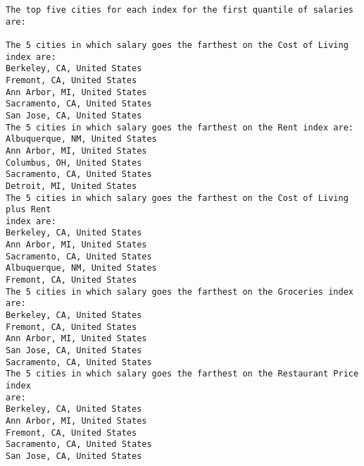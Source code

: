 \documentclass[11pt]{article}
\begin{document}
    \begin{Verbatim}[commandchars=\\\{\}]
The top five cities for each index for the first quantile of salaries are:

The 5 cities in which salary goes the farthest on the Cost of Living index are:
Berkeley, CA, United States
Fremont, CA, United States
Ann Arbor, MI, United States
Sacramento, CA, United States
San Jose, CA, United States
The 5 cities in which salary goes the farthest on the Rent index are:
Albuquerque, NM, United States
Ann Arbor, MI, United States
Columbus, OH, United States
Sacramento, CA, United States
Detroit, MI, United States
The 5 cities in which salary goes the farthest on the Cost of Living plus Rent
index are:
Berkeley, CA, United States
Ann Arbor, MI, United States
Sacramento, CA, United States
Albuquerque, NM, United States
Fremont, CA, United States
The 5 cities in which salary goes the farthest on the Groceries index are:
Berkeley, CA, United States
Fremont, CA, United States
Ann Arbor, MI, United States
San Jose, CA, United States
Sacramento, CA, United States
The 5 cities in which salary goes the farthest on the Restaurant Price index
are:
Berkeley, CA, United States
Ann Arbor, MI, United States
Fremont, CA, United States
Sacramento, CA, United States
San Jose, CA, United States
    \end{Verbatim}
\end{document}
